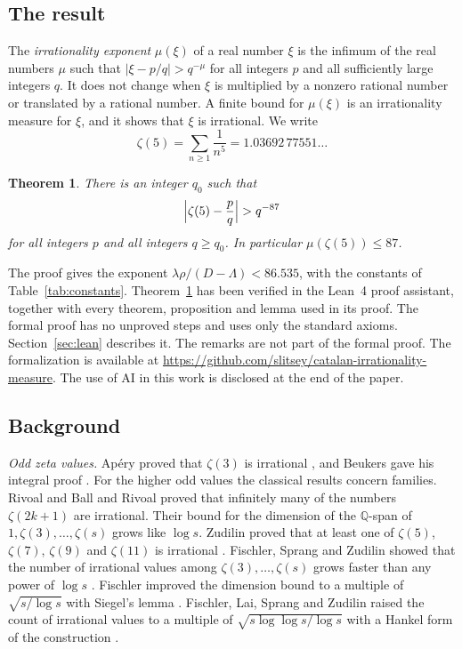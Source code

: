 \documentclass[11pt]{amsart}
\newcommand{\FormalizationURL}{https://github.com/slitsey/catalan-irrationality-measure}
\newcommand{\FormalizationLink}{\url{\FormalizationURL}}
\newtheorem{theorem}{Theorem}[section]
\theoremstyle{definition}
\theoremstyle{remark}
\numberwithin{equation}{section}
\newcommand{\Q}{\mathbb Q}
\begin{document}
\subsection{The result}
The \emph{irrationality exponent} $\mu(\xi)$ of a real number $\xi$ is the infimum of the real numbers $\mu$ such that
$|\xi-p/q|>q^{-\mu}$ for all integers $p$ and all sufficiently large integers $q$. It does not change when $\xi$ is
multiplied by a nonzero rational number or translated by a rational number. A finite bound for $\mu(\xi)$ is an
irrationality measure for $\xi$, and it shows that $\xi$ is irrational. We write
\[
 \zeta(5)=\sum_{n\ge1}\frac1{n^5}=1.03692\,77551\ldots
\]

\begin{theorem}\label{thm:main}
There is an integer $q_0$ such that
\[
 \Bigl|\zeta(5)-\frac pq\Bigr|>q^{-87}
\]
for all integers $p$ and all integers $q\ge q_0$. In particular $\mu(\zeta(5))\le87$.
\end{theorem}

The proof gives the exponent $\lambda\rho/(D-\Lambda)<86.535$, with the constants of Table~\ref{tab:constants}.
Theorem~\ref{thm:main} has been verified in the Lean~4 proof assistant, together with every theorem, proposition and
lemma used in its proof. The formal proof has no unproved steps and uses only the standard axioms.
Section~\ref{sec:lean} describes it. The remarks are not part of the formal proof. The formalization is available at
\FormalizationLink. The use of AI in this work is disclosed at the end of the paper.

\subsection{Background}\label{ssec:background}
\emph{Odd zeta values.} Ap\'ery proved that $\zeta(3)$ is irrational \cite{Apery79}, and Beukers gave his integral
proof \cite{Beukers79}. For the higher odd values the classical results concern families. Rivoal
\cite{Rivoal00} and Ball and Rivoal \cite{BallRivoal01} proved that infinitely many of the numbers $\zeta(2k+1)$ are
irrational. Their bound for the dimension of the $\Q$-span of $1,\zeta(3),\dots,\zeta(s)$ grows like $\log s$.
Zudilin proved that at least one of $\zeta(5)$, $\zeta(7)$, $\zeta(9)$ and $\zeta(11)$ is irrational
\cite{Zudilin01,Zudilin04}. Fischler, Sprang and Zudilin showed that the number of irrational values among
$\zeta(3),\dots,\zeta(s)$ grows faster than any power of $\log s$ \cite{FSZ19}. Fischler improved the dimension bound
to a multiple of $\sqrt{s/\log s}$ with Siegel's lemma \cite{Fischler26}. Fischler, Lai, Sprang and Zudilin raised the
count of irrational values to a multiple of $\sqrt{s\log\log s/\log s}$ with a Hankel form of the construction
\cite{FLSZ26}.
\end{document}

